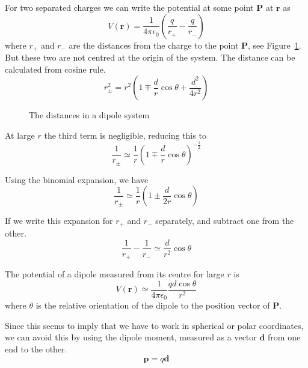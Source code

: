 \documentclass[12pt,chapterprefix=false,dvipsnames]{scrbook}
\theoremstyle{dotless}
\theoremstyle{definition}
\begin{document}
For two separated charges we can write the potential at some
point \textbf{P} at $\bm{r}$ as
\begin{equation}
	V\left(\bm{r}\right) =
	\frac{1}{4\pi\epsilon_{0}}\left(\frac{q}{r_{+}} - \frac{q}{r_{-}}\right)
\end{equation}
where $r_{+}$ and $r_{-}$ are
the distances from the charge to the point
\textbf{P}, see Figure~\ref{fig:dipole_distances}.
But these two are not centred at the origin of the system. The
distance can be calculated from cosine rule.
\begin{equation}
	r^2_{\pm} = r^2\left(1 \mp\frac{d}{r}\cos{\theta} + \frac{d^2}{4r^2}\right)
\end{equation}

\begin{figure}[htpb]
	\centering
	
	\caption{The distances in a dipole system}%
	\label{fig:dipole_distances}
\end{figure}

At large $r$ the third term is negligible,
reducing this to
\begin{equation}
	\frac{1}{r_{\pm}}
	\simeq
	\frac{1}{r}{\left(1 \mp \frac{d}{r} \cos{\theta}\right)}^{-\frac{1}{2}}
\end{equation}

Using the binomial expansion, we have
\begin{equation}
	\frac{1}{r_\pm}
	\simeq
	\frac{1}{r}\left(1 \pm \frac{d}{2r} \cos{\theta}\right)
\end{equation}

If we write this expansion for $r_+$ and
$r_-$ separately, and subtract one from the
other.
\begin{equation}
	\frac{1}{r_+} - \frac{1}{r_-}
	\simeq
	\frac{d}{r^2}\cos{\theta}
\end{equation}

The potential of a dipole measured from its centre for large
$r$ is
\begin{equation}
	V \left(\bm{r}\right)\simeq
	\frac{1}{4\pi\epsilon_{0}}\frac{q d \cos{\theta}}{r^2}
\end{equation}
where $\theta$ is the relative orientation of the
dipole to the position vector of \textbf{P}.

Since this seems to imply that we have to work in spherical or
polar coordinates, we can avoid this by using the dipole moment,
measured as a vector $\bm{d}$ from one end to the
other.
\begin{equation}
	\label{eq:dipole_moment_def}
	\bm{p} = q \bm{d}
\end{equation}
\end{document}
